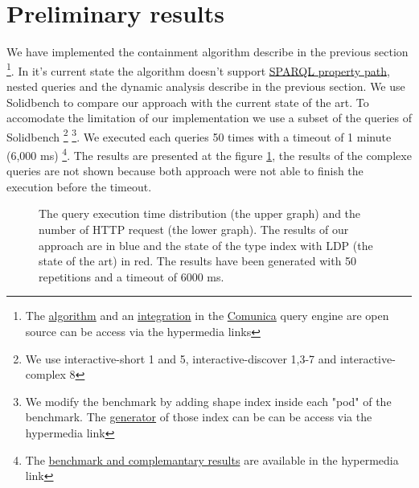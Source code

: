 \section{Preliminary results}
We have implemented the containment algorithm describe in the previous section 
\footnote{The \href{https://github.com/constraintAutomaton/query-shape-detection}{algorithm} and an 
\href{https://github.com/constraintAutomaton/comunica-feature-link-traversal/tree/feature/shapeIndex}{integration} 
in the \href{https://github.com/comunica/comunica}{Comunica} query engine are open source can be access via the hypermedia links}.
In it's current state the algorithm doesn't support \href{https://www.w3.org/TR/sparql11-query/#propertypaths}{SPARQL property path}, nested queries
and the dynamic analysis describe in the previous section. 
We use Solidbench \cite{Taelman2023} to compare our approach with the current state of the art.
To accomodate the limitation of our implementation we use a subset of the queries of Solidbench
\footnote{ We use interactive-short 1 and 5, interactive-discover 1,3-7 and interactive-complex 8}
\footnote{We modify the benchmark by adding shape index inside each "pod" of the benchmark.
The \href{https://github.com/constraintAutomaton/rdf-dataset-fragmenter.js/tree/feature/shapeIndex}{generator} of those index can be  can be access via the hypermedia link
}.
We executed each queries 50 times with a timeout of 1 minute (6,000 ms) 
\footnote{The \href{https://github.com/constraintAutomaton/amw_shape_index_results}{benchmark and complemantary results} are available in the hypermedia link}.
The results are presented at the figure \ref{fig:result}, the results of the complexe queries are not shown because both approach 
were not able to finish the execution before the timeout.

\begin{figure}[ht]
    
    \caption{The query execution time distribution (the upper graph) and the number of HTTP request (the lower graph).
    The results of our approach are in blue and the state of the type index with LDP (the state of the art) in red.
    The results have been generated with 50 repetitions and a timeout of 6000 ms. 
    }
    \label{fig:result}
\end{figure}
  